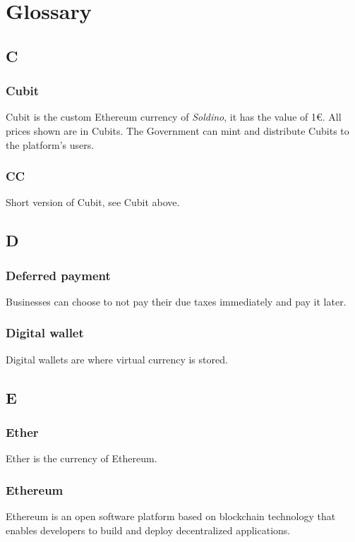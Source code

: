 \section{Glossary}
	\subsection*{C}
		\subsubsection*{Cubit}
		Cubit is the custom Ethereum currency of \textit{Soldino}, it has the value 
		of 1\euro. All prices shown are in Cubits. The Government can mint 
		and distribute Cubits to the platform's users.
		\subsubsection*{CC}
		Short version of Cubit, see Cubit above.
	
	\subsection*{D}
		\subsubsection*{Deferred payment}
		Businesses can choose to not pay their due taxes immediately and pay it 
		later.
		\subsubsection*{Digital wallet}
		Digital wallets are where virtual currency is stored.
	
	\subsection*{E}
		\subsubsection*{Ether}
		Ether is the currency of Ethereum.
		\subsubsection*{Ethereum}
		Ethereum is an open software platform based on blockchain technology 
		that enables developers to build and deploy decentralized applications.
		
